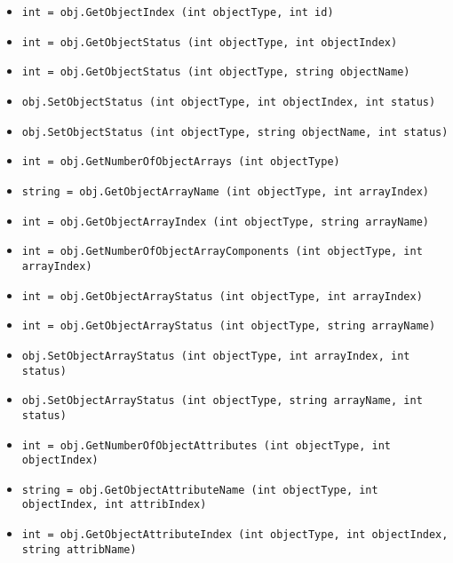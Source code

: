 \begin{itemize}
\item  \verb|int = obj.GetObjectIndex (int objectType, int id)|

\item  \verb|int = obj.GetObjectStatus (int objectType, int objectIndex)|

\item  \verb|int = obj.GetObjectStatus (int objectType, string objectName)|

\item  \verb|obj.SetObjectStatus (int objectType, int objectIndex, int status)|

\item  \verb|obj.SetObjectStatus (int objectType, string objectName, int status)|

\item  \verb|int = obj.GetNumberOfObjectArrays (int objectType)|

\item  \verb|string = obj.GetObjectArrayName (int objectType, int arrayIndex)|

\item  \verb|int = obj.GetObjectArrayIndex (int objectType, string arrayName)|

\item  \verb|int = obj.GetNumberOfObjectArrayComponents (int objectType, int arrayIndex)|

\item  \verb|int = obj.GetObjectArrayStatus (int objectType, int arrayIndex)|

\item  \verb|int = obj.GetObjectArrayStatus (int objectType, string arrayName)|

\item  \verb|obj.SetObjectArrayStatus (int objectType, int arrayIndex, int status)|

\item  \verb|obj.SetObjectArrayStatus (int objectType, string arrayName, int status)|

\item  \verb|int = obj.GetNumberOfObjectAttributes (int objectType, int objectIndex)|

\item  \verb|string = obj.GetObjectAttributeName (int objectType, int objectIndex, int attribIndex)|

\item  \verb|int = obj.GetObjectAttributeIndex (int objectType, int objectIndex, string attribName)|


\end{itemize}
